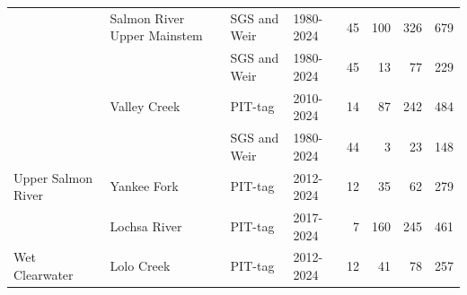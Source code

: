 \documentclass[10pt,a4paper]{article}
\begin{document}
\begin{table}
\begin{tabular}[t]{llllrrrr}
 & Salmon River Upper Mainstem & SGS and Weir & 1980-2024 & 45 & 100 & 326 & 679\\

 &  & SGS and Weir & 1980-2024 & 45 & 13 & 77 & 229\\

 & \multirow[t]{-2}{*}{\raggedright\arraybackslash Valley Creek} & PIT-tag & 2010-2024 & 14 & 87 & 242 & 484\\

 &  & SGS and Weir & 1980-2024 & 44 & 3 & 23 & 148\\

\multirow[t]{-13}{*}[8\dimexpr\aboverulesep+\belowrulesep+\cmidrulewidth]{\raggedright\arraybackslash Upper Salmon River} & \multirow[t]{-2}{*}{\raggedright\arraybackslash Yankee Fork} & PIT-tag & 2012-2024 & 12 & 35 & 62 & 279\\

 & Lochsa River & PIT-tag & 2017-2024 & 7 & 160 & 245 & 461\\

\multirow[t]{-2}{*}[1\dimexpr\aboverulesep+\belowrulesep+\cmidrulewidth]{\raggedright\arraybackslash Wet Clearwater} & Lolo Creek & PIT-tag & 2012-2024 & 12 & 41 & 78 & 257\\
\bottomrule
\end{tabular}
\end{table}
\end{document}
